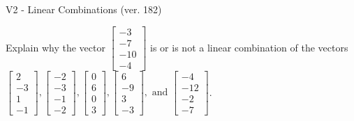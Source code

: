 \begin{exercise}
  \begin{exerciseTitle}V2 - Linear Combinations (ver. 182)\end{exerciseTitle}
  \begin{exerciseStatement}
    Explain why the vector \(\left[\begin{array}{c}
-3 \\
-7 \\
-10 \\
-4
\end{array}\right]\)  is or is not a linear 
	combination of the vectors \(\left[\begin{array}{c}
2 \\
-3 \\
1 \\
-1
\end{array}\right] , \left[\begin{array}{c}
-2 \\
-3 \\
-1 \\
-2
\end{array}\right] , \left[\begin{array}{c}
0 \\
6 \\
0 \\
3
\end{array}\right] , \left[\begin{array}{c}
6 \\
-9 \\
3 \\
-3
\end{array}\right] , \text{ and } \left[\begin{array}{c}
-4 \\
-12 \\
-2 \\
-7
\end{array}\right]\).
	



\end{exerciseStatement}
\end{exercise}
